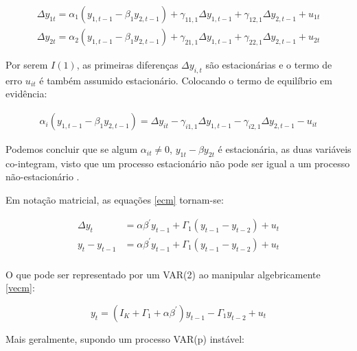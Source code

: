 \documentclass[a4paper,
               article,
               12pt,
               openany,
               oneside,
               english,
               brazil]{abntex2}
\numberwithin{equation}{section}
\begin{document}
    \begin{equation}
        \begin{aligned}
            \label{ecm}
            \Delta y_{1t} = \alpha_1 (y_{1,t-1} - \beta_1 y_{2, t-1}) + \gamma_{11,1} \Delta y_{1,t-1} + \gamma_{12,1} \Delta y_{2,t-1} + u_{1t} \\
            \Delta y_{2t} = \alpha_2 (y_{1,t-1} - \beta_1 y_{2, t-1}) + \gamma_{21,1} \Delta y_{1,t-1} + \gamma_{22,1} \Delta y_{2,t-1} + u_{2t}
        \end{aligned}
    \end{equation}

    Por serem $ I(1) $, as primeiras diferenças $ \Delta y_{i,t} $ são estacionárias e o termo de erro $ u_{it} $ é também assumido estacionário. Colocando o termo de equilíbrio em evidência:

    \begin{align*}
        \alpha_i (y_{1,t-1} - \beta_1 y_{2, t-1}) = \Delta y_{it} - \gamma_{i1,1} \Delta y_{1,t-1} - \gamma_{i2,1} \Delta y_{2,t-1} - u_{it}
    \end{align*}

    Podemos concluir que se algum $ \alpha_{it} \neq 0 $, $ y_{1t} - \beta y_{2t} $ é estacionária, as duas variáveis co-integram, visto que um processo estacionário não pode ser igual a um processo não-estacionário \cite[p.~244-247]{lutkepool}.

    Em notação matricial, as equações \eqref{ecm} tornam-se:

    \begin{equation}
        \label{vecm}
        \begin{aligned}
            \Delta y_t &= \alpha \beta^{'} y_{t-1} + \Gamma_1(y_{t-1} - y_{t-2}) + u_t \\
            y_t - y_{t-1} &= \alpha \beta^{'} y_{t-1} + \Gamma_1(y_{t-1} - y_{t-2}) + u_t \\
        \end{aligned}
    \end{equation}

    O que pode ser representado por um VAR(2) ao manipular algebricamente \eqref{vecm}:

    \begin{equation}
        \label{vecm-var}
        y_t = (I_K + \Gamma_1 + \alpha \beta^{'})y_{t-1} - \Gamma_1 y_{t-2} + u_t
    \end{equation}

    Mais geralmente, supondo um processo VAR(p) instável:
    
\end{document}

